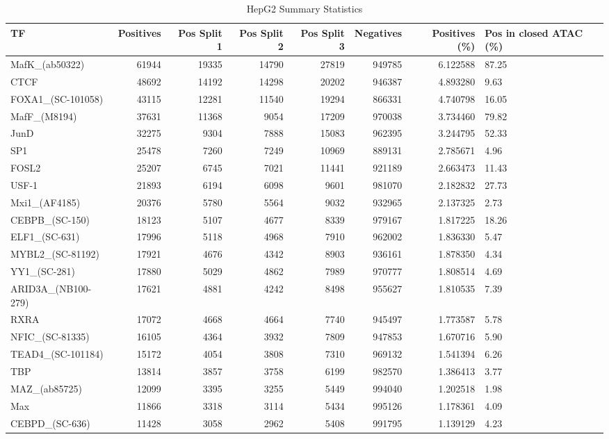 \begin{table}
\caption{HepG2 Summary Statistics}
\label{tab:hepg2}
\begin{tabular}{lrrrrrrl}
\toprule
TF & Positives & Pos Split 1 & Pos Split 2 & Pos Split 3 & Negatives & Positives (\%) & Pos in closed ATAC (\%) \\
\midrule
MafK\_(ab50322) & 61944 & 19335 & 14790 & 27819 & 949785 & 6.122588 & 87.25 \\
CTCF & 48692 & 14192 & 14298 & 20202 & 946387 & 4.893280 & 9.63 \\
FOXA1\_(SC-101058) & 43115 & 12281 & 11540 & 19294 & 866331 & 4.740798 & 16.05 \\
MafF\_(M8194) & 37631 & 11368 & 9054 & 17209 & 970038 & 3.734460 & 79.82 \\
JunD & 32275 & 9304 & 7888 & 15083 & 962395 & 3.244795 & 52.33 \\
SP1 & 25478 & 7260 & 7249 & 10969 & 889131 & 2.785671 & 4.96 \\
FOSL2 & 25207 & 6745 & 7021 & 11441 & 921189 & 2.663473 & 11.43 \\
USF-1 & 21893 & 6194 & 6098 & 9601 & 981070 & 2.182832 & 27.73 \\
Mxi1\_(AF4185) & 20376 & 5780 & 5564 & 9032 & 932965 & 2.137325 & 2.73 \\
CEBPB\_(SC-150) & 18123 & 5107 & 4677 & 8339 & 979167 & 1.817225 & 18.26 \\
ELF1\_(SC-631) & 17996 & 5118 & 4968 & 7910 & 962002 & 1.836330 & 5.47 \\
MYBL2\_(SC-81192) & 17921 & 4676 & 4342 & 8903 & 936161 & 1.878350 & 4.34 \\
YY1\_(SC-281) & 17880 & 5029 & 4862 & 7989 & 970777 & 1.808514 & 4.69 \\
ARID3A\_(NB100-279) & 17621 & 4881 & 4242 & 8498 & 955627 & 1.810535 & 7.39 \\
RXRA & 17072 & 4668 & 4664 & 7740 & 945497 & 1.773587 & 5.78 \\
NFIC\_(SC-81335) & 16105 & 4364 & 3932 & 7809 & 947853 & 1.670716 & 5.90 \\
TEAD4\_(SC-101184) & 15172 & 4054 & 3808 & 7310 & 969132 & 1.541394 & 6.26 \\
TBP & 13814 & 3857 & 3758 & 6199 & 982570 & 1.386413 & 3.77 \\
MAZ\_(ab85725) & 12099 & 3395 & 3255 & 5449 & 994040 & 1.202518 & 1.98 \\
Max & 11866 & 3318 & 3114 & 5434 & 995126 & 1.178361 & 4.09 \\
CEBPD\_(SC-636) & 11428 & 3058 & 2962 & 5408 & 991795 & 1.139129 & 4.23 \\

\end{tabular}
\end{table}

